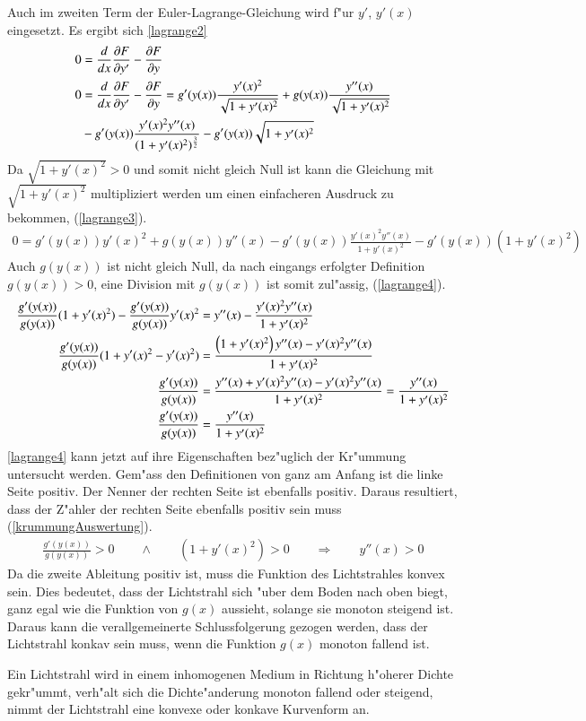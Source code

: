 Auch im zweiten Term der Euler-Lagrange-Gleichung wird f"ur $y'$, $y'(x)$
eingesetzt. Es ergibt sich \eqref{lagrange2}
\begin{align}
	0 &= \frac{d}{dx} \frac{\partial F}{\partial y'} - \frac{\partial F}{\partial y} \label{lagrangePrinzip} \\
		0 &= \frac{d}{dx} \frac{\partial F}{\partial y'} - \frac{\partial F}{\partial y}
	= g'(y(x)) \frac{y'(x)^2}{\sqrt{1 + y'(x)^2}} + g(y(x)) \frac{y''(x)}{\sqrt{1 + y'(x)^2}} \notag \\
	&- g'(y(x)) \frac{y'(x)^2 y''(x)}{(1 + y'(x)^2)^\frac{3}{2}}  - g'(y(x)) \sqrt{1 + y'(x)^2}
	\label{lagrange2}
\end{align}
Da $\sqrt{1 + y'(x)^2} > 0$ und somit nicht gleich Null ist kann die
Gleichung mit $\sqrt{1 + y'(x)^2}$  multipliziert werden um einen
einfacheren Ausdruck zu bekommen, (\eqref{lagrange3}).
\begin{align}
	0 = g'(y(x)) y'(x)^2 + g(y(x)) y''(x) - g'(y(x)) \frac{y'(x)^2 y''(x)}{1 + y'(x)^2} - g'(y(x)) (1 + y'(x)^2)
	\label{lagrange3}
\end{align}
Auch $g(y(x))$ ist nicht gleich Null, da nach eingangs erfolgter
Definition $g(y(x)) > 0$, eine Division mit $g(y(x))$ ist somit zul"assig,
(\eqref{lagrange4}).
\begin{align}
	\frac{g'(y(x))}{g(y(x))} (1 + y'(x)^2) - \frac{g'(y(x))}{g(y(x))} y'(x)^2 &=  y''(x) - \frac{y'(x)^2 y''(x)}{1 + y'(x)^2} \notag \\
	\frac{g'(y(x))}{g(y(x))} (1 + y'(x)^2 - y'(x)^2) &= \frac{\left(1 + y'(x)^2 \right)y''(x) - y'(x)^2 y''(x)}{1 + y'(x)^2} \notag \\
	\frac{g'(y(x))}{g(y(x))} &= \frac{y''(x) + y'(x)^2 y''(x) - y'(x)^2 y''(x)}{1 + y'(x)^2} = \frac{y''(x)}{1 + y'(x)^2}\notag \\
	\frac{g'(y(x))}{g(y(x))} &= \frac{y''(x)}{1 + y'(x)^2}
	\label{lagrange4}
\end{align}
\eqref{lagrange4} kann jetzt auf ihre Eigenschaften bez"uglich der
Kr"ummung untersucht werden. Gem"ass den Definitionen von ganz am Anfang
ist die linke Seite positiv. 
Der Nenner der rechten Seite ist ebenfalls positiv. Daraus resultiert,
dass der Z"ahler der rechten Seite ebenfalls positiv sein muss
(\eqref{krummungAuswertung}).
\begin{align}
	\frac{g'(y(x))}{g(y(x))} > 0 \qquad \wedge \qquad (1 + y'(x)^2) > 0 \qquad \Rightarrow \qquad y''(x) > 0
	\label{krummungAuswertung}
\end{align}
Da die zweite Ableitung positiv ist, muss die Funktion des Lichtstrahles
konvex sein.
Dies bedeutet, dass der Lichtstrahl sich "uber dem Boden nach oben biegt,
ganz egal wie die Funktion von $g(x)$ aussieht, solange sie monoton
steigend ist.
Daraus kann die verallgemeinerte Schlussfolgerung gezogen werden, dass
der Lichtstrahl konkav sein muss, wenn die Funktion $g(x)$ monoton
fallend ist.
\begin{satz}
Ein Lichtstrahl wird in einem inhomogenen Medium in Richtung h"oherer
Dichte gekr"ummt, verh"alt sich die Dichte"anderung monoton fallend oder
steigend, nimmt der Lichtstrahl eine konvexe oder konkave Kurvenform an.
\end{satz}
